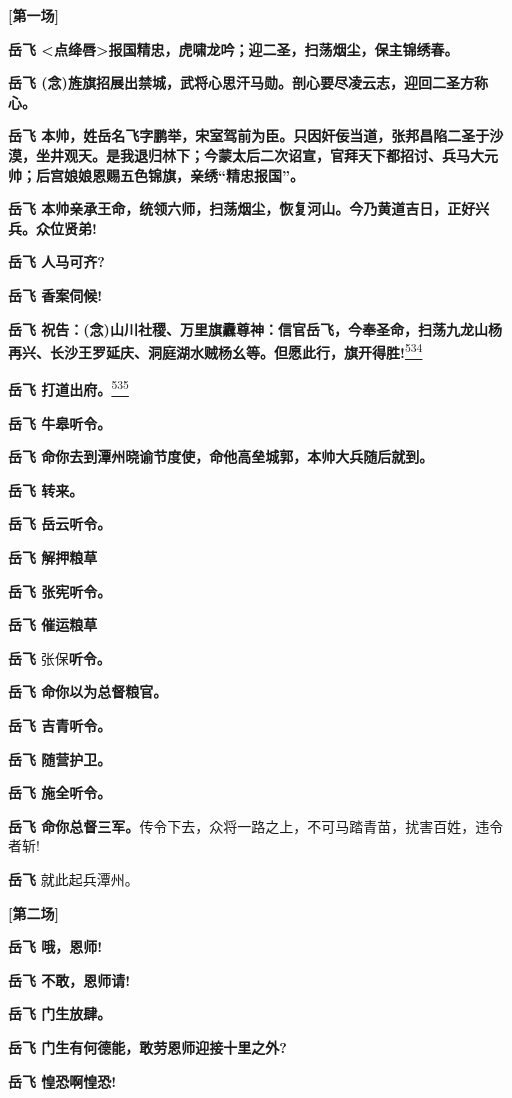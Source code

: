 \textbf{{[}第一场{]}}

\textbf{岳飞
\textless{}点绛唇\textgreater{}报国精忠，虎啸龙吟；迎二圣，扫荡烟尘，保主锦绣春。}

\textbf{岳飞
(念)旌旗招展出禁城，武将心思汗马勋。剖心要尽凌云志，迎回二圣方称心。}

\textbf{岳飞
本帅，姓岳名飞字鹏举，宋室驾前为臣。只因奸佞当道，张邦昌陷二圣于沙漠，坐井观天。是我退归林下；今蒙太后二次诏宣，官拜天下都招讨、兵马大元帅；后宫娘娘恩赐五色锦旗，亲绣``精忠报国''。}

\textbf{岳飞
本帅亲承王命，统领六师，扫荡烟尘，恢复河山。今乃黄道吉日，正好兴兵。众位贤弟!}

\textbf{岳飞 人马可齐?}

\textbf{岳飞 香案伺候!}

\textbf{岳飞
祝告：(念)山川社稷、万里旗纛尊神：信官岳飞，今奉圣命，扫荡九龙山杨再兴、长沙王罗延庆、洞庭湖水贼杨幺等。但愿此行，旗开得胜!}\protect\hyperlink{fn534}{\textsuperscript{534}}

\textbf{岳飞 打道出府。}\protect\hyperlink{fn535}{\textsuperscript{535}}

\textbf{岳飞 牛皋听令。}

\textbf{岳飞 命你去到潭州晓谕节度使，命他高垒城郭，本帅大兵随后就到。}

\textbf{岳飞 转来。}

\textbf{岳飞 岳云听令。}

\textbf{岳飞 解押粮草}

\textbf{岳飞 张宪听令。}

\textbf{岳飞 催运粮草}

\textbf{岳飞} 张保\textbf{听令。}

\textbf{岳飞 命你以为总督粮官。}

\textbf{岳飞 吉青听令。}

\textbf{岳飞 随营护卫。}

\textbf{岳飞 施全听令。}

\textbf{岳飞
命你总督三军。}传令下去，众将一路之上，不可马踏青苗，扰害百姓，违令者斩!

\textbf{岳飞} 就此起兵潭州。

\textbf{{[}第二场{]}}

\textbf{岳飞 哦，恩师!}

\textbf{岳飞 不敢，恩师请!}

\textbf{岳飞 门生放肆。}

\textbf{岳飞 门生有何德能，敢劳恩师迎接十里之外?}

\textbf{岳飞 惶恐啊惶恐!}

